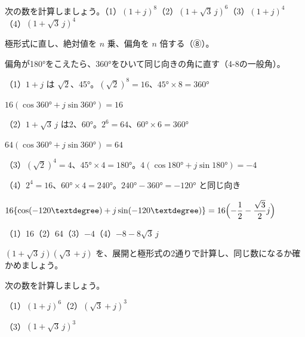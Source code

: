 \begin{reidai}[ド・モアブルの定理]
次の数を計算しましょう。\newline（1）$(1+j)^8$\newline（2）$(1+\sqrt3\,j)^6$\newline（3）$(1+j)^4$\newline（4）$(1+\sqrt3\,j)^4$\par
\kangaekata 極形式に直し、絶対値を $n$ 乗、偏角を $n$ 倍する（⑧）。\par
偏角が180°をこえたら、360°をひいて同じ向きの角に直す（4-8の一般角）。\par
\shiki{}\zw{} （1）$1+j$ は $\sqrt2$、45°。$(\sqrt2)^8=16$、$45°\times8=360°$\par
\bkvijb $16(\cos360°+j\sin360°)=16$\par
\bkvijq （2）$1+\sqrt3\,j$ は2、60°。$2^6=64$、$60°\times6=360°$\par
\bkvijb $64(\cos360°+j\sin360°)=64$\par
\bkvijq （3）$(\sqrt2)^4=4$、$45°\times4=180°$。$4(\cos180°+j\sin180°)=-4$\par
\bkvijq （4）$2^4=16$、$60°\times4=240°$。$240°-360°=-120°$ と同じ向き\par
\bkvijb $16\{\cos(-120°)+j\sin(-120°)\}=16\Bigl(-\dfrac12-\dfrac{\sqrt3}{2}j\Bigr)$\par
\kotae{}\zw{} （1）16\quad（2）64\quad（3）$-4$\quad（4）$-8-8\sqrt3\,j$
\end{reidai}

\noindent\begin{minipage}[t]{0.485\linewidth}\vspace{0pt}
\begin{jibun}
$(1+\sqrt3\,j)(\sqrt3+j)$ を、展開と極形式の2通りで計算し、同じ数になるか確かめましょう。
\end{jibun}
\end{minipage}\hfill
\begin{minipage}[t]{0.485\linewidth}\vspace{0pt}
\begin{jibun}
次の数を計算しましょう。\par
（1）$(1+j)^6$\newline（2）$(\sqrt3+j)^3$\par
（3）$(1+\sqrt3\,j)^3$
\end{jibun}
\end{minipage}

